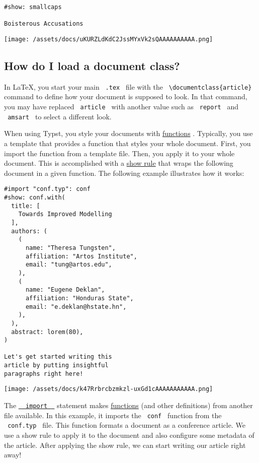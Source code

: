 \begin{verbatim}
#show: smallcaps

Boisterous Accusations
\end{verbatim}

\texttt{[image: /assets/docs/uKURZLdKdC2JssMYxVk2sQAAAAAAAAAA.png]}

\subsection{How do I load a document class?}\label{templates}

In LaTeX, you start your main \texttt{\ .tex\ } file with the
\texttt{\ \textbackslash{}documentclass\{article\}\ } command to define
how your document is supposed to look. In that command, you may have
replaced \texttt{\ article\ } with another value such as
\texttt{\ report\ } and \texttt{\ amsart\ } to select a different look.

When using Typst, you style your documents with
\href{/docs/reference/foundations/function/}{functions} . Typically, you
use a template that provides a function that styles your whole document.
First, you import the function from a template file. Then, you apply it
to your whole document. This is accomplished with a
\href{/docs/reference/styling/\#show-rules}{show rule} that wraps the
following document in a given function. The following example
illustrates how it works:

\begin{verbatim}
#import "conf.typ": conf
#show: conf.with(
  title: [
    Towards Improved Modelling
  ],
  authors: (
    (
      name: "Theresa Tungsten",
      affiliation: "Artos Institute",
      email: "tung@artos.edu",
    ),
    (
      name: "Eugene Deklan",
      affiliation: "Honduras State",
      email: "e.deklan@hstate.hn",
    ),
  ),
  abstract: lorem(80),
)

Let's get started writing this
article by putting insightful
paragraphs right here!
\end{verbatim}

\texttt{[image: /assets/docs/k47Rrbrcbzmkzl-uxGd1cAAAAAAAAAAA.png]}

The
\href{/docs/reference/scripting/\#modules}{\texttt{\ }{\texttt{\ import\ }}\texttt{\ }}
statement makes \href{/docs/reference/foundations/function/}{functions}
(and other definitions) from another file available. In this example, it
imports the \texttt{\ conf\ } function from the \texttt{\ conf.typ\ }
file. This function formats a document as a conference article. We use a
show rule to apply it to the document and also configure some metadata
of the article. After applying the show rule, we can start writing our
article right away!

